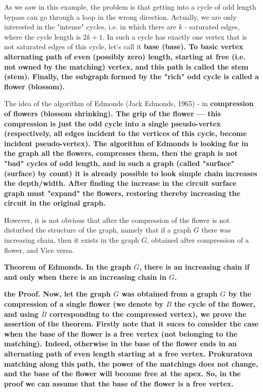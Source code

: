 
As we saw in this example, the problem is that getting into a cycle of odd length bypass can go through a loop in the wrong direction. Actually, we are only interested in the "intense" cycles, i.e. in which there are $k$ - saturated edges, where the cycle length is $2k+1$. In such a cycle has exactly one vertex that is not saturated edges of this cycle, let's call it \bf{base} (base). To basic vertex alternating path of even (possibly zero) length, starting at free (i.e. not owned by the matching) vertex, and this path is called the \bf{stem} (stem). Finally, the subgraph formed by the "rich" odd cycle is called a \bf{flower} (blossom).


The idea of the algorithm of Edmonds (Jack Edmonds, 1965) - in \bf{compression of flowers} (blossom shrinking). The grip of the flower --- this compression is just the odd cycle into a single pseudo-vertex (respectively, all edges incident to the vertices of this cycle, become incident pseudo-vertex). The algorithm of Edmonds is looking for in the graph all the flowers, compresses them, then the graph is not "bad" cycles of odd length, and in such a graph (called "surface" (surface) by count) it is already possible to look simple chain increases the depth/width. After finding the increase in the circuit surface graph must "expand" the flowers, restoring thereby increasing the circuit in the original graph.

However, it is not obvious that after the compression of the flower is not disturbed the structure of the graph, namely that if a graph $G$ there was increasing chain, then it exists in the graph $\overline G$, obtained after compression of a flower, and Vice versa.

\bf{Theorem of Edmonds}. In the graph $\overline G$, there is an increasing chain if and only when there is an increasing chain in $G$.

\bf{the Proof}. Now, let the graph $\overline G$ was obtained from a graph $G$ by the compression of a single flower (we denote by $B$ the cycle of the flower, and using $\overline B$ corresponding to the compressed vertex), we prove the assertion of the theorem. Firstly note that it suces to consider the case when the base of the flower is a free vertex (not belonging to the matching). Indeed, otherwise in the base of the flower ends in an alternating path of even length starting at a free vertex. Prokuratova matching along this path, the power of the matchings does not change, and the base of the flower will become free at the apex. So, in the proof we can assume that the base of the flower is a free vertex.


